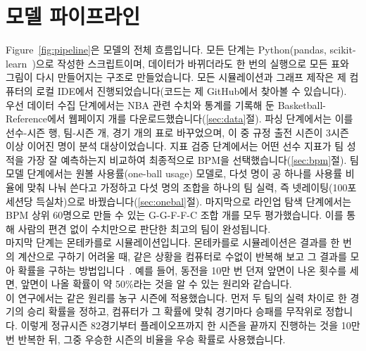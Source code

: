 \documentclass[conference,a4paper]{IEEEtran}
\begin{document}
\section{모델 파이프라인}\label{sec:pipeline}
Figure~\ref{fig:pipeline}은 모델의 전체 흐름입니다. 모든 단계는 Python(pandas, scikit-learn~\cite{sklearn})으로 작성한 스크립트이며, 데이터가 바뀌더라도 한 번의 실행으로 모든 표와 그림이 다시 만들어지는 구조로 만들었습니다. 모든 시뮬레이션과 그래프 제작은 제 컴퓨터의 로컬 IDE에서 진행되었습니다(코드는 제 GitHub에서 찾아볼 수 있습니다).\\

우선 데이터 수집 단계에서는 NBA 관련 수치와 통계를 기록해 둔 Basketball-Reference에서 웹페이지 \NPages{}개를 다운로드했습니다(\ref{sec:data}절). 파싱 단계에서는 이를 선수-시즌 \NPlayerRows{}행, 팀-시즌 \NTeamSeasons{}개, 경기 \NGames{}개의 표로 바꾸었으며, 이 중 규정 출전 시즌이 3시즌 이상 이어진 \NPrimePlayers{}명이 분석 대상이었습니다. 지표 검증 단계에서는 어떤 선수 지표가 팀 성적을 가장 잘 예측하는지 비교하여 최종적으로 BPM을 선택했습니다(\ref{sec:bpm}절). 팀 모델 단계에서는 원볼 사용률(one-ball usage) 모델로, 다섯 명이 공 하나를 사용률 비율에 맞춰 나눠 쓴다고 가정하고 다섯 명의 조합을 하나의 팀 실력, 즉 넷레이팅(100포세션당 득실차)으로 바꿨습니다(\ref{sec:onebal}절). 마지막으로 라인업 탐색 단계에서는 BPM 상위 60명으로 만들 수 있는 G-G-F-F-C 조합 \NFives{}개를 모두 평가했습니다. 이를 통해 사람의 편견 없이 수치만으로 판단한 최고의 팀이 완성됩니다.\\

마지막 단계는 몬테카를로 시뮬레이션입니다. 몬테카를로 시뮬레이션은 결과를 한 번의 계산으로 구하기 어려울 때, 같은 상황을 컴퓨터로 수없이 반복해 보고 그 결과를 모아 확률을 구하는 방법입니다~\cite{mc}. 예를 들어, 동전을 10만 번 던져 앞면이 나온 횟수를 세면, 앞면이 나올 확률이 약 50\%라는 것을 알 수 있는 원리와 같습니다.\\

이 연구에서는 같은 원리를 농구 시즌에 적용했습니다. 먼저 두 팀의 실력 차이로 한 경기의 승리 확률을 정하고, 컴퓨터가 그 확률에 맞춰 경기마다 승패를 무작위로 정합니다. 이렇게 정규시즌 82경기부터 플레이오프까지 한 시즌을 끝까지 진행하는 것을 10만 번 반복한 뒤, 그중 우승한 시즌의 비율을 우승 확률로 사용했습니다.
\end{document}
